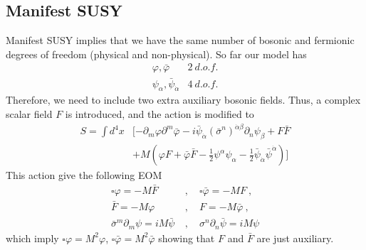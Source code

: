 \documentclass[a4paper,12pt]{article}
\numberwithin{equation}{section}
\numberwithin{exe}{section}
\newcommand{\p}{{\partial}}
\renewcommand{\a}{{\alpha}}
\newcommand{\ad}{{\dot\alpha}}
\renewcommand{\b}{{\beta}}
\newcommand{\s}{{\sigma}}
\renewcommand{\sb}{{\bar\sigma}}
\newcommand{\vphi}{{\varphi}}
\newcommand{\vphib}{{\bar\varphi}}
\newcommand{\psib}{{\bar\psi}}
\begin{document}
\subsection{Manifest SUSY}
Manifest SUSY implies that we have the same number of bosonic and fermionic degrees of freedom (physical and non-physical). So far our model has
	$$
		\begin{array}{cc}
		\vphi, \vphib & 2\ d.o.f. \\
		\psi_\a, \psib_\ad & 4\ d.o.f.
		\end{array}
	$$
Therefore, we need to include two extra auxiliary bosonic fields. Thus, a complex scalar field $F$ is introduced, and the action is modified to
	\begin{align}
	S = \int d^4 x & [-\p_m\vphi \p^m\vphib - i\psib_\ad(\sb^n)^{\ad\b}\p_n \psi_\b + F{\bar F} \nonumber \\
	& + M(\vphi F + \vphib \bar F -\frac12 \psi^\a \psi_\a - \frac12 \psib_\ad \psib^\ad)] \label{star1}
	\end{align}
This action give the following EOM
	\begin{align}
	\square \vphi = - M \bar F\ &,\quad \square\vphib = -M F\ , \nonumber \\
	\bar F = - M\vphi\ &,\quad F = -M\vphib\ , \\
	\sb^m \p_m \psi = iM\psib\ &,\quad \s^n\p_n\psib = iM\psi \nonumber
	\end{align}
which imply $\square \vphi = M^2 \vphi$, $\square \vphib = M^2 \vphib$ showing that $F$ and $\bar F$ are just auxiliary.
\end{document}
